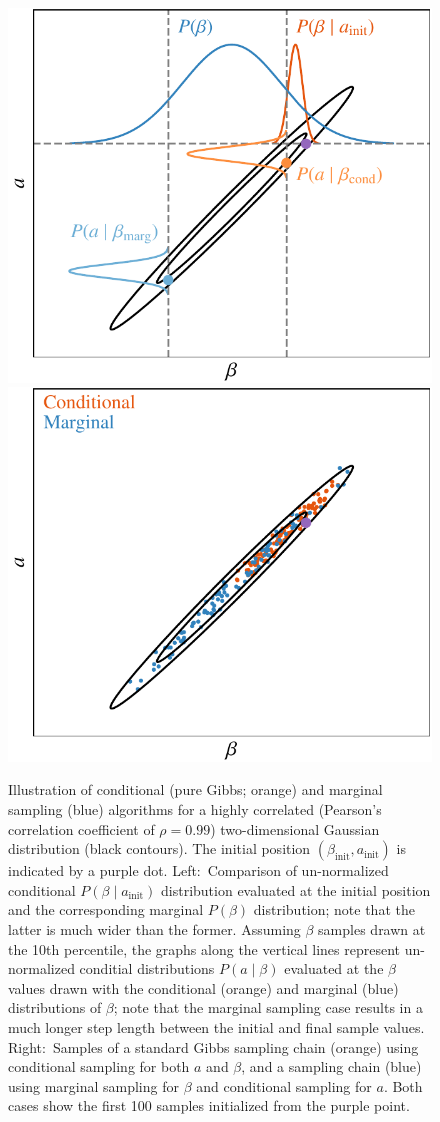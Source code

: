 \documentclass{aa}
\begin{document}
\begin{figure}
  \center
  \includegraphics[width=0.46\linewidth]{figs/cond_vs_marg_graph_plot_v3.pdf}\hspace*{1cm}
  \includegraphics[width=0.46\linewidth]{figs/cond_vs_marg_scatt_plot_seed12350.pdf}
  \caption{Illustration of conditional (pure Gibbs; orange) and marginal
    sampling (blue) algorithms for a highly correlated (Pearson's
    correlation coefficient of $\rho=0.99$) two-dimensional Gaussian
    distribution (black contours). The initial position $(\beta_{\mathrm{init}},a_{\mathrm{init}})$ is
    indicated by a purple dot. Left:~Comparison of un-normalized
    conditional $P(\beta\mid a_{\mathrm{init}})$ distribution evaluated at the initial position
    and the corresponding marginal $P(\beta)$ distribution; note that the
    latter is much wider than the former. Assuming $\beta$ samples drawn
    at the 10th percentile, the graphs along the vertical lines
    represent un-normalized conditial distributions $P(a\mid\beta)$ evaluated
    at the $\beta$ values drawn with the
    conditional (orange) and marginal (blue) distributions of $\beta$;
    note that the marginal sampling case results in a much longer step
    length between the initial and final sample values.
    Right:~Samples of a
    standard Gibbs sampling chain (orange) using conditional sampling for
    both $a$ and $\beta$, and a sampling chain (blue) using marginal
    sampling for $\beta$ and conditional sampling for $a$. Both cases
    show the first 100 samples initialized from the purple point.}
  \label{fig:marginal_conditional_plot}
\end{figure}
\end{document}
